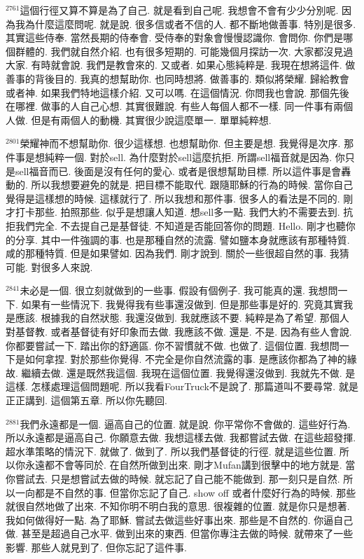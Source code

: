 \documentclass{book}
\begin{document}
$^{2761}$這個行徑又算不算是為了自己.
就是看到自己呢.
我想會不會有少少分別呢.
因為我為什麼這麼問呢.
就是說.
很多信或者不信的人.
都不斷地做善事.
特別是很多.
其實這些侍奉.
當然長期的侍奉會.
受侍奉的對象會慢慢認識你.
會問你.
你們是哪個群體的.
我們就自然介紹.
也有很多短期的.
可能幾個月探訪一次.
大家都沒見過大家.
有時就會說.
我們是教會來的.
又或者.
如果心態純粹是.
我現在想將這件.
做善事的背後目的.
我真的想幫助你.
也同時想將.
做善事的.
類似將榮耀.
歸給教會或者神.
如果我們特地這樣介紹.
又可以嗎.
在這個情況.
你問我也會說.
那個先後在哪裡.
做事的人自己心想.
其實很難說.
有些人每個人都不一樣.
同一件事有兩個人做.
但是有兩個人的動機.
其實很少說這麼單一.
單單純粹想.

$^{2801}$榮耀神而不想幫助你.
很少這樣想.
也想幫助你.
但主要是想.
我覺得是次序.
那件事是想純粹一個.
對於sell.
為什麼對於sell這麼抗拒.
所謂sell福音就是因為.
你只是sell福音而已.
後面是沒有任何的愛心.
或者是很想幫助目標.
所以這件事是會轟動的.
所以我想要避免的就是.
把目標不能取代.
跟隨耶穌的行為的時候.
當你自己覺得是這樣想的時候.
這樣就行了.
所以我想和那件事.
很多人的看法是不同的.
剛才打卡那些.
拍照那些.
似乎是想讓人知道.
想sell多一點.
我們大約不需要去到.
抗拒我們完全.
不去提自己是基督徒.
不知道是否能回答你的問題.
Hello.
剛才也聽你的分享.
其中一件強調的事.
也是那種自然的流露.
譬如鹽本身就應該有那種特質.
咸的那種特質.
但是如果譬如.
因為我們.
剛才說到.
關於一些很超自然的事.
我猜可能.
對很多人來說.

$^{2841}$未必是一個.
很立刻就做到的一些事.
假設有個例子.
我可能真的還.
我想問一下.
如果有一些情況下.
我覺得我有些事還沒做到.
但是那些事是好的.
究竟其實我是應該.
根據我的自然狀態.
我還沒做到.
我就應該不要.
純粹是為了希望.
那個人對基督教.
或者基督徒有好印象而去做.
我應該不做.
還是.
不是.
因為有些人會說.
你都要嘗試一下.
踏出你的舒適區.
你不習慣就不做.
也做了.
這個位置.
我想問一下是如何拿捏.
對於那些你覺得.
不完全是你自然流露的事.
是應該你都為了神的緣故.
繼續去做.
還是既然我這個.
我現在這個位置.
我覺得還沒做到.
我就先不做.
是這樣.
怎樣處理這個問題呢.
所以我看FourTruck不是說了.
那篇道叫不要尋常.
就是正正講到.
這個第五章.
所以你先聽回.

$^{2881}$我們永遠都是一個.
逼高自己的位置.
就是說.
你平常你不會做的.
這些好行為.
所以永遠都是逼高自己.
你願意去做.
我想這樣去做.
我都嘗試去做.
在這些超發揮.
超水準策略的情況下.
就做了.
做到了.
所以我們基督徒的行徑.
就是這些位置.
所以你永遠都不會等同於.
在自然所做到出來.
剛才Mufan講到很擊中的地方就是.
當你嘗試去.
只是想嘗試去做的時候.
就忘記了自己能不能做到.
那一刻只是自然.
所以一向都是不自然的事.
但當你忘記了自己.
show off 或者什麼好行為的時候.
那些就很自然地做了出來.
不知你明不明白我的意思.
很複雜的位置.
就是你只是想著.
我如何做得好一點.
為了耶穌.
嘗試去做這些好事出來.
那些是不自然的.
你逼自己做.
甚至是超過自己水平.
做到出來的東西.
但當你專注去做的時候.
就帶來了一些影響.
那些人就見到了.
但你忘記了這件事.
\end{document}

